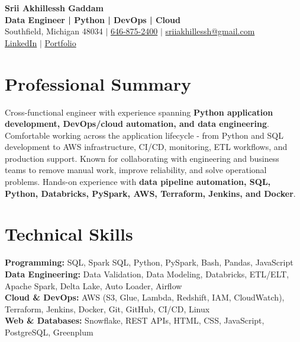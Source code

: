 \documentclass[letterpaper,10pt]{article}
\begin{document}
\fontsize{9.35pt}{10.45pt}\selectfont

\begin{center}
    {\LARGE \textbf{Srii Akhillessh Gaddam}} \\[-1pt]
    \textbf{Data Engineer | Python | DevOps | Cloud} \\[2pt]
    Southfield, Michigan 48034 $|$
    \href{tel:6468752400}{646-875-2400} $|$
    \href{mailto:sriiakhillessh@gmail.com}{sriiakhillessh@gmail.com} \\[1pt]
    \href{https://www.linkedin.com/in/srii-akhiilessh-gaddam-b48668191/}{LinkedIn} $|$
    \href{https://sriiakhillesshg.github.io/portfolio/}{Portfolio}
\end{center}
\vspace{-8pt}

\section{Professional Summary}
\small{Cross-functional engineer with experience spanning \textbf{Python application development, DevOps/cloud automation, and data engineering}. Comfortable working across the application lifecycle - from Python and SQL development to AWS infrastructure, CI/CD, monitoring, ETL workflows, and production support. Known for collaborating with engineering and business teams to remove manual work, improve reliability, and solve operational problems. Hands-on experience with \textbf{data pipeline automation, SQL, Python, Databricks, PySpark, AWS, Terraform, Jenkins, and Docker}.}

\section{Technical Skills}
\small{
\textbf{Programming:} SQL, Spark SQL, Python, PySpark, Bash, Pandas, JavaScript \\
\textbf{Data Engineering:} Data Validation, Data Modeling, Databricks, ETL/ELT, Apache Spark, Delta Lake, Auto Loader, Airflow \\
\textbf{Cloud \& DevOps:} AWS (S3, Glue, Lambda, Redshift, IAM, CloudWatch), Terraform, Jenkins, Docker, Git, GitHub, CI/CD, Linux \\
\textbf{Web \& Databases:} Snowflake, REST APIs, HTML, CSS, JavaScript, PostgreSQL, Greenplum
}

\end{document}
